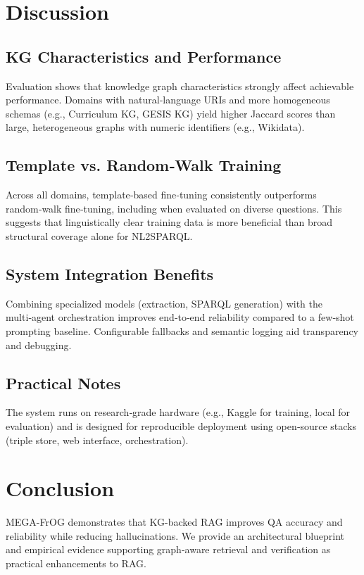 \documentclass[12pt,a4paper,onecolumn]{article}
\begin{document}
\section*{Discussion}
\subsection*{KG Characteristics and Performance}
Evaluation shows that knowledge graph characteristics strongly affect achievable performance. Domains with natural‑language URIs and more homogeneous schemas (e.g., Curriculum KG, GESIS KG) yield higher Jaccard scores than large, heterogeneous graphs with numeric identifiers (e.g., Wikidata).

\subsection*{Template vs. Random‑Walk Training}
Across all domains, template‑based fine‑tuning consistently outperforms random‑walk fine‑tuning, including when evaluated on diverse questions. This suggests that linguistically clear training data is more beneficial than broad structural coverage alone for NL2SPARQL.

\subsection*{System Integration Benefits}
Combining specialized models (extraction, SPARQL generation) with the multi‑agent orchestration improves end‑to‑end reliability compared to a few‑shot prompting baseline. Configurable fallbacks and semantic logging aid transparency and debugging.

\subsection*{Practical Notes}
The system runs on research‑grade hardware (e.g., Kaggle for training, local for evaluation) and is designed for reproducible deployment using open‑source stacks (triple store, web interface, orchestration).

\section*{Conclusion}
MEGA-FrOG demonstrates that KG-backed RAG improves QA accuracy and reliability while reducing hallucinations. We provide an architectural blueprint and empirical evidence supporting graph-aware retrieval and verification as practical enhancements to RAG.
\end{document}
